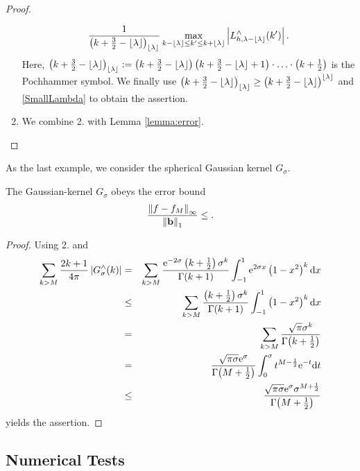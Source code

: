\begin{proof}
\begin{enumerate}
\begin{align*}
        \frac{1}{\left(k+\frac{3}{2}-\left\lfloor\lambda\right\rfloor\right)_{\left\lfloor\lambda\right\rfloor}} 
        \max_{k-\left\lfloor\lambda\right\rfloor \le k' \le k+\left\lfloor\lambda\right\rfloor} 
        \left\vert L_{h,\lambda-\left\lfloor\lambda\right\rfloor}^{\wedge}{\hspace{-0.4ex}}\left(k'\right)\right\vert.
    \end{align*}
    Here, $\left(k+\frac{3}{2}-\left\lfloor\lambda\right\rfloor\right)_{\left\lfloor\lambda\right\rfloor} := 
    \left(k+\frac{3}{2}-\left\lfloor\lambda\right\rfloor\right) \left(k+\frac{3}{2}-\left\lfloor\lambda\right\rfloor+1\right)
    \cdot \ldots \cdot 
    \left(k+\frac{1}{2}\right)$ is the Pochhammer symbol. We finally use 
    $\left(k+\frac{3}{2}-\left\lfloor\lambda\right\rfloor\right)_{\left\lfloor\lambda\right\rfloor} \ge
    \left(k+\frac{3}{2}-\left\lfloor\lambda\right\rfloor\right)^{\left\lfloor\lambda\right\rfloor}$ and 
    \eqref{SmallLambda} to obtain the assertion.
  \item We combine 2. with Lemma \ref{lemma:error}. 
  \end{enumerate}
\end{proof}

As the last example, we consider the spherical Gaussian kernel $G_{\sigma}$. 

\begin{lemma}
  The Gaussian-kernel $G_{\sigma}$ obeys the error bound
  \begin{equation}
    \label{error:G}
    \frac{\left\|f - f_{M}\right\|_{\infty}}{\left\|\mathbf{b}\right\|_1} \le .
  \end{equation} 
\end{lemma}
\begin{proof}
  Using 2. and
  \begin{eqnarray*}
    \sum_{k>M} \frac{2k+1}{4\pi} \left\vert G_{\sigma}^{\wedge}{\hspace{-0.4ex}}\left(k\right)\right\vert
    &=&
    \sum_{k>M} \frac{\mbox{\rm{e}}^{-2\sigma}
    \left(k+\frac{1}{2}\right)\sigma^k}{\Gamma{\hspace{-0.4ex}}\left(k+1\right)} \int_{-1}^{1}
    \mbox{\rm{e}}^{2\sigma x} \left(1-x^2\right)^k \text{\rm{d}} x\\
    &\le&
    \sum_{k>M} \frac{\left(k+\frac{1}{2}\right)\sigma^k}{\Gamma{\hspace{-0.4ex}}\left(k+1\right)}
    \int_{-1}^{1} \left(1-x^2\right)^k \text{\rm{d}} x\\
    &=&
    \sum_{k>M} \frac{\sqrt{\pi}\sigma^k}{\Gamma{\hspace{-0.4ex}}\left(k+\frac{1}{2}\right)}\\
    &=&
    \frac{\sqrt{\pi\sigma}\mbox{\rm{e}}^{\sigma}}{\Gamma{\hspace{-0.4ex}}\left(M+\frac{1}{2}\right)} 
    \int_{0}^{\sigma} t^{M-\frac{1}{2}} \mbox{\rm{e}}^{-t} \text{\rm{d}} t\\
    &\le&
    \frac{\sqrt{\pi\sigma}\mbox{\rm{e}}^{\sigma} \sigma^{M+\frac{1}{2}}}{\Gamma{\hspace{-0.4ex}}\left(M
    +\frac{1}{2}\right)}
  \end{eqnarray*}
  yields the assertion.
\end{proof}

\subsection{Numerical Tests}

